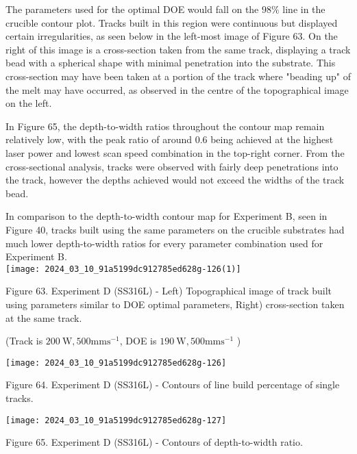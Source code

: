 \documentclass[10pt]{article}
\begin{document}
The parameters used for the optimal DOE would fall on the $98 \%$ line in the crucible contour plot. Tracks built in this region were continuous but displayed certain irregularities, as seen below in the left-most image of Figure 63. On the right of this image is a cross-section taken from the same track, displaying a track bead with a spherical shape with minimal penetration into the substrate. This cross-section may have been taken at a portion of the track where "beading up" of the melt may have occurred, as observed in the centre of the topographical image on the left.

In Figure 65, the depth-to-width ratios throughout the contour map remain relatively low, with the peak ratio of around 0.6 being achieved at the highest laser power and lowest scan speed combination in the top-right corner. From the cross-sectional analysis, tracks were observed with fairly deep penetrations into the track, however the depths achieved would not exceed the widths of the track bead.

In comparison to the depth-to-width contour map for Experiment B, seen in Figure 40, tracks built using the same parameters on the crucible substrates had much lower depth-to-width ratios for every parameter combination used for Experiment B.\\
\texttt{[image: 2024\_03\_10\_91a5199dc912785ed628g-126(1)]}

Figure 63. Experiment D (SS316L) - Left) Topographical image of track built using parameters similar to DOE optimal parameters, Right) cross-section taken at the same track.

(Track is $200 \mathrm{~W}, 500 \mathrm{mms}^{-1}$, DOE is $190 \mathrm{~W}, 500 \mathrm{mms}^{-1}$ )

\begin{center}
\texttt{[image: 2024\_03\_10\_91a5199dc912785ed628g-126]}
\end{center}

Figure 64. Experiment D (SS316L) - Contours of line build percentage of single tracks.

\begin{center}
\texttt{[image: 2024\_03\_10\_91a5199dc912785ed628g-127]}
\end{center}

Figure 65. Experiment D (SS316L) - Contours of depth-to-width ratio.
\end{document}
